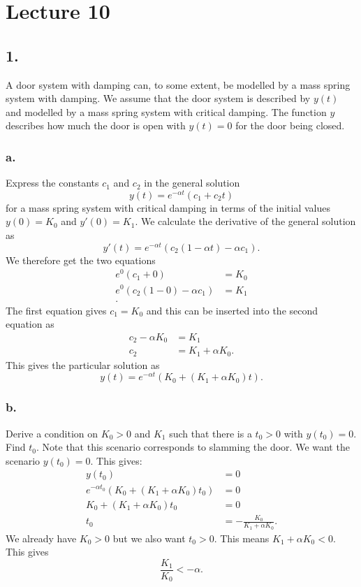 \section*{Lecture 10}

\subsection*{1.} A door system with damping can, to some extent, be modelled by a mass spring system with damping. We assume that the door system is described by $y(t)$ and modelled by a mass spring system with critical damping. The function $y$ describes how much the door is open with $y(t) = 0$ for the door being closed.

\subsubsection*{a.} Express the constants $c_1$ and $c_2$ in the general solution
\[ 
y(t) = e^{- \alpha t} \left( c_1 + c_2t \right)
\]
for a mass spring system with critical damping in terms of the initial values $y(0) = K_0$ and $y'(0) = K_1$. 
\bigbreak
We calculate the derivative of the general solution as
\[ 
y'(t) = e^{-\alpha t} \left( c_2 (1 - \alpha t) - \alpha c_1 \right)
.\]
We therefore get the two equations
\begin{align*}
  e^{0} \left( c_1 + 0 \right) &= K_0 \\
  e^{0} \left( c_2 \left( 1 - 0 \right) - \alpha c_1 \right) &= K_1 \\
.\end{align*}
The first equation gives $c_1 = K_0$ and this can be inserted into the second equation as
\begin{align*}
  c_2 - \alpha K_0 &= K_1 \\
  c_2 &= K_1 + \alpha K_0
.\end{align*}
This gives the particular solution as
\[ 
  y(t) = e^{-\alpha t} \left( K_0 + (K_1 + \alpha K_0) t\right)
.\]


\subsubsection*{b.} Derive a condition on $K_0 > 0$ and $K_1$ such that there is a $t_0 > 0$ with $y(t_0) = 0$. Find $t_0$. Note that this scenario corresponds to slamming the door.
\bigbreak
We want the scenario $y(t_0) = 0$. This gives:
\begin{align*}
  y(t_0) &= 0 \\ 
  e^{-\alpha t_0} \left( K_0 + \left( K_1 + \alpha K_0 \right)t_0 \right) &= 0 \\
  K_0 + \left( K_1 + \alpha K_0 \right) t_0 &= 0 \\
  t_0 &= - \frac{K_0}{K_1 + \alpha K_0}
.\end{align*}
We already have $K_0 > 0$ but we also want $t_0 > 0$. This means $K_1 + \alpha K_0 < 0$. This gives
\[ 
\frac{K_1}{K_0} < -\alpha
.\]


